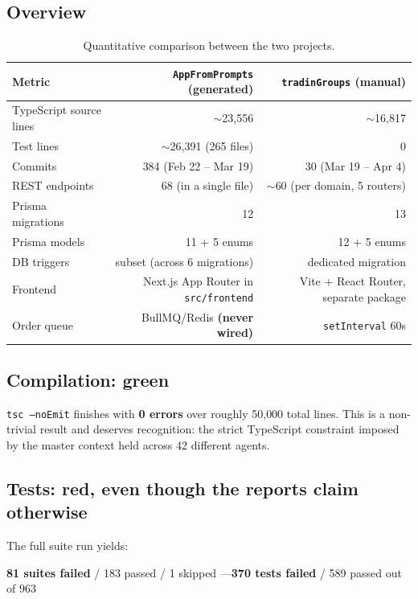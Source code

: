 \documentclass[11pt,a4paper]{article}
\newcommand{\ok}[1]{\textcolor{okgreen}{\textbf{#1}}}
\newcommand{\fail}[1]{\textcolor{failred}{\textbf{#1}}}
\newcommand{\file}[1]{\texttt{\small #1}}
\begin{document}
\subsection{Overview}

\begin{table}[h!]
\centering
\small
\begin{tabular}{lrr}
\toprule
\textbf{Metric} & \textbf{\file{AppFromPrompts} (generated)} & \textbf{\file{tradinGroups} (manual)} \\
\midrule
TypeScript source lines & $\sim$23{,}556 & $\sim$16{,}817 \\
Test lines & $\sim$26{,}391 (265 files) & 0 \\
Commits & 384 (Feb 22 -- Mar 19) & 30 (Mar 19 -- Apr 4) \\
REST endpoints & 68 (in a single file) & $\sim$60 (per domain, 5 routers) \\
Prisma migrations & 12 & 13 \\
Prisma models & 11 + 5 enums & 12 + 5 enums \\
DB triggers & subset (across 6 migrations) & dedicated migration \\
Frontend & Next.js App Router in \file{src/frontend} & Vite + React Router, separate package \\
Order queue & BullMQ/Redis \fail{(never wired)} & \file{setInterval} 60s \\
\bottomrule
\end{tabular}
\caption{Quantitative comparison between the two projects.}
\end{table}

\subsection{Compilation: green}
\file{tsc --noEmit} finishes with \ok{0 errors} over roughly 50{,}000 total lines. This is a non-trivial result and deserves recognition: the strict TypeScript constraint imposed by the master context held across 42 different agents.

\subsection{Tests: red, even though the reports claim otherwise}
The full suite run yields:

\begin{center}
\fail{81 suites failed} / 183 passed / 1 skipped \quad---\quad \fail{370 tests failed} / 589 passed out of 963
\end{center}
\end{document}
